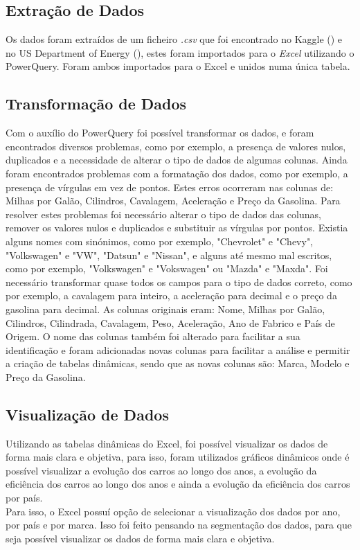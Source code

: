 \documentclass[a4paper]{article}
\begin{document}
\subsection{Extração de Dados}
Os dados foram extraídos de um ficheiro \textit{.csv} que foi encontrado no Kaggle (\cite{kaggle}) e no US Department of Energy (\cite{usdoe}), 
estes foram importados para o \textit{Excel} utilizando o PowerQuery. Foram ambos importados para o Excel e unidos numa única tabela.
\subsection{Transformação de Dados}
Com o auxílio do PowerQuery foi possível transformar os dados, e foram encontrados diversos problemas,
como por exemplo, a presença de valores nulos, duplicados e a necessidade de alterar o tipo de dados de algumas colunas.
Ainda foram encontrados problemas com a formatação dos dados, como por exemplo, a presença de vírgulas em vez de pontos. 
Estes erros ocorreram nas colunas de: Milhas por Galão, Cilindros, Cavalagem, Aceleração e Preço da Gasolina.
Para resolver estes problemas foi necessário alterar o tipo de dados das colunas, remover os valores nulos e duplicados e substituir as vírgulas por pontos.
Existia alguns nomes com sinónimos, como por exemplo, "Chevrolet" e "Chevy", "Volkswagen" e "VW", "Datsun" e "Nissan", e alguns até mesmo mal escritos, 
como por exemplo, "Volkswagen" e "Vokswagen" ou "Mazda" e "Maxda".
Foi necessário transformar quase todos os campos para o tipo de dados correto, como por exemplo, a cavalagem para inteiro, 
a aceleração para decimal e o preço da gasolina para decimal.
As colunas originais eram: Nome, Milhas por Galão, Cilindros, Cilindrada, Cavalagem, Peso, Aceleração, Ano de Fabrico e País de Origem.
O nome das colunas também foi alterado para facilitar a sua identificação e foram adicionadas novas colunas para facilitar a análise
e permitir a criação de tabelas dinâmicas, sendo que as novas colunas são: Marca, Modelo e Preço da Gasolina.

\subsection{Visualização de Dados}
Utilizando as tabelas dinâmicas do Excel, foi possível visualizar os dados de forma mais clara e objetiva,
para isso, foram utilizados gráficos dinâmicos onde é possível visualizar a evolução dos carros ao longo dos anos,
a evolução da eficiência dos carros ao longo dos anos e ainda a evolução da eficiência dos carros por país.
\\
Para isso, o Excel possuí opção de selecionar a visualização dos dados por ano, por país e por marca.
Isso foi feito pensando na segmentação dos dados, para que seja possível visualizar os dados de forma mais clara e objetiva.
\end{document}
